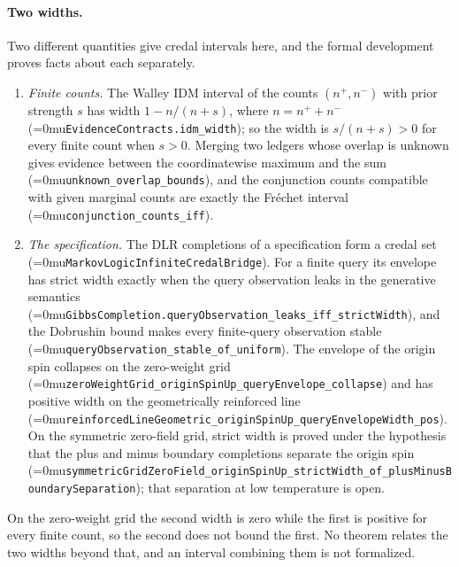 \documentclass[11pt]{article}
\newcommand{\leanname}[1]{\textup{\Urlmuskip=0mu\relax\nolinkurl{#1}}}
\theoremstyle{definition}
\theoremstyle{remark}
\begin{document}
\paragraph{Two widths.}
Two different quantities give credal intervals here, and the formal
development proves facts about each separately.
\begin{enumerate}
\item \emph{Finite counts.}  The Walley IDM interval of the counts
  $(n^+, n^-)$ with prior strength $s$ has width $1 - n/(n+s)$, where
  $n = n^+ + n^-$ (\leanname{EvidenceContracts.idm_width}); so the width is
  $s/(n+s) > 0$ for every finite count when $s > 0$.  Merging two ledgers whose
  overlap is unknown gives evidence between the coordinatewise maximum and the
  sum (\leanname{unknown_overlap_bounds}), and the conjunction counts compatible
  with given marginal counts are exactly the Fr\'echet interval
  (\leanname{conjunction_counts_iff}).
\item \emph{The specification.}  The DLR completions of a specification form a
  credal set (\leanname{MarkovLogicInfiniteCredalBridge}).  For a finite query
  its envelope has strict width exactly when the query observation leaks in the
  generative semantics
  (\leanname{GibbsCompletion.queryObservation_leaks_iff_strictWidth}), and the
  Dobrushin bound makes every finite-query observation stable
  (\leanname{queryObservation_stable_of_uniform}).  The envelope of the origin
  spin collapses on the zero-weight grid
  (\leanname{zeroWeightGrid_originSpinUp_queryEnvelope_collapse}) and has
  positive width on the geometrically reinforced line
  (\leanname{reinforcedLineGeometric_originSpinUp_queryEnvelopeWidth_pos}).  On
  the symmetric zero-field grid, strict width is proved under the hypothesis
  that the plus and minus boundary completions separate the origin spin
  (\leanname{symmetricGridZeroField_originSpinUp_strictWidth_of_plusMinusBoundarySeparation});
  that separation at low temperature is open.
\end{enumerate}
On the zero-weight grid the second width is zero while the first is positive
for every finite count, so the second does not bound the first.  No theorem
relates the two widths beyond that, and an interval combining them is not
formalized.
\end{document}

